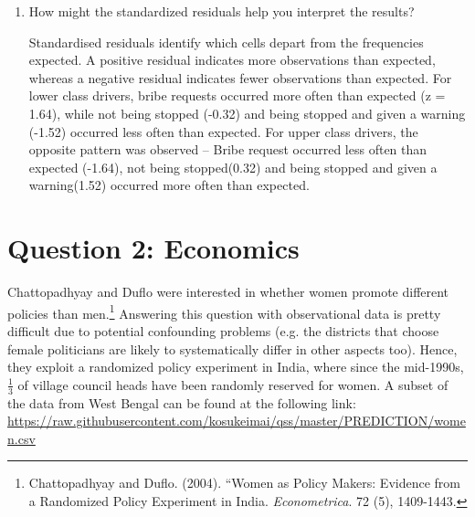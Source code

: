 \documentclass[12pt,letterpaper]{article}
\begin{document}
\begin{enumerate}
\begin{table}[h]
\begin{tabular}{l | c c c }
		\end{tabular}
	\end{table}
	
	 
	
	
	\vspace{7cm}
	\item [(d)] How might the standardized residuals help you interpret the results?  
	\vspace{1cm}
	
	Standardised  residuals identify which cells depart from the frequencies expected. A positive residual indicates more observations than expected, whereas a negative residual indicates fewer observations than expected. For lower class drivers, bribe requests occurred more often than expected (z = 1.64), while not being stopped (-0.32) and being stopped and given a warning (-1.52) occurred less often than expected. For upper class drivers, the opposite pattern was observed -- Bribe request occurred less often than expected (-1.64), not being stopped(0.32) and being stopped and given a warning(1.52) occurred more often than expected.
	
	
\end{enumerate}
\newpage

\section*{Question 2: Economics}
Chattopadhyay and Duflo were interested in whether women promote different policies than men.\footnote{Chattopadhyay and Duflo. (2004). ``Women as Policy Makers: Evidence from a Randomized Policy Experiment in India. \textit{Econometrica}. 72 (5), 1409-1443.} Answering this question with observational data is pretty difficult due to potential confounding problems (e.g. the districts that choose female politicians are likely to systematically differ in other aspects too). Hence, they exploit a randomized policy experiment in India, where since the mid-1990s, $\frac{1}{3}$ of village council heads have been randomly reserved for women. A subset of the data from West Bengal can be found at the following link: \url{https://raw.githubusercontent.com/kosukeimai/qss/master/PREDICTION/women.csv}\\
\end{document}
